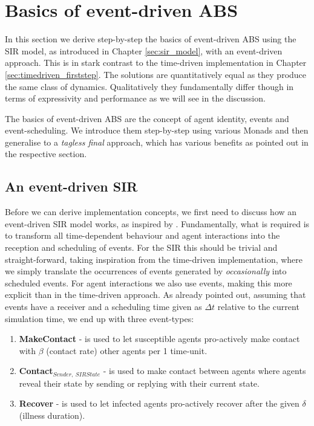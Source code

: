 \section{Basics of event-driven ABS}
In this section we derive step-by-step the basics of event-driven ABS using the SIR model, as introduced in Chapter \ref{sec:sir_model}, with an event-driven approach. This is in stark contrast to the time-driven implementation in Chapter \ref{sec:timedriven_firststep}. The solutions are quantitatively equal as they produce the same class of dynamics. Qualitatively they fundamentally differ though in terms of expressivity and performance as we will see in the discussion.

The basics of event-driven ABS are the concept of agent identity, events and event-scheduling. We introduce them step-by-step using various Monads and then generalise to a \textit{tagless final} approach, which has various benefits as pointed out in the respective section. 

\subsection{An event-driven SIR}
Before we can derive implementation concepts, we first need to discuss how an event-driven SIR model works, as inspired by \cite{macal_agent-based_2010}. Fundamentally, what is required is to transform all time-dependent behaviour and agent interactions into the reception and scheduling of events. For the SIR this should be trivial and straight-forward, taking inspiration from the time-driven implementation, where we simply translate the occurrences of events generated by \textit{occasionally} into scheduled events. For agent interactions we also use events, making this more explicit than in the time-driven approach. As already pointed out, assuming that events have a receiver and a scheduling time given as $\Delta t$ relative to the current simulation time, we end up with three event-types:

\begin{enumerate}
	\item \textbf{MakeContact} - is used to let susceptible agents pro-actively make contact with $\beta$ (contact rate) other agents per 1 time-unit.
	\item \textbf{Contact$_{Sender, \ SIRState}$} - is used to make contact between agents where agents reveal their state by sending or replying with their current state.
	\item \textbf{Recover} - is used to let infected agents pro-actively recover after the given $\delta$ (illness duration). 
\end{enumerate}

